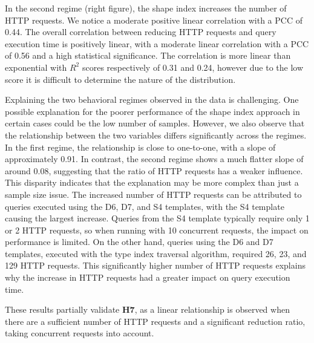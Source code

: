 In the second regime (right figure), the shape index increases the number of \ac{HTTP} requests.
We notice a moderate positive linear correlation with a \ac{PCC} of 0.44.
The overall correlation between reducing \ac{HTTP} requests and query execution time is positively linear, with a moderate linear correlation with a \ac{PCC} of 0.56 and a high statistical significance.
The correlation is more linear than exponential with $R^2$ scores respectively of 0.31 and 0.24, however due to the low score it is difficult to determine the nature of the distribution.

Explaining the two behavioral regimes observed in the data is challenging.
One possible explanation for the poorer performance of the shape index approach in certain cases could be the low number of samples.
However, we also observe that the relationship between the two variables differs significantly across the regimes.
In the first regime, the relationship is close to one-to-one, with a slope of approximately 0.91.
In contrast, the second regime shows a much flatter slope of around 0.08, suggesting that the ratio of \ac{HTTP} requests has a weaker influence.
This disparity indicates that the explanation may be more complex than just a sample size issue.
The increased number of \ac{HTTP} requests can be attributed to queries executed using the D6, D7, and S4 templates, with the S4 template causing the largest increase.
Queries from the S4 template typically require only 1 or 2 \ac{HTTP} requests, so when running with 10 concurrent requests, the impact on performance is limited.
On the other hand, queries using the D6 and D7 templates, executed with the type index traversal algorithm, required 26, 23, and 129 \ac{HTTP} requests.
This significantly higher number of \ac{HTTP} requests explains why the increase in \ac{HTTP} requests had a greater impact on query execution time.

These results partially validate \textbf{H7}, as a linear relationship is observed when there are a sufficient number of \ac{HTTP} requests and a significant reduction ratio, taking concurrent requests into account.

\subsection{}


